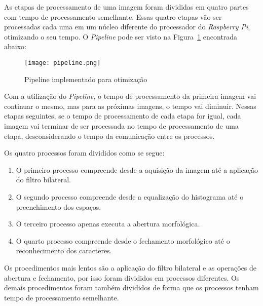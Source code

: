 As etapas de processamento de uma imagem foram divididas em quatro partes com
tempo de processamento semelhante. Essas quatro etapas vão ser processadas cada
uma em um núcleo diferente do processador do \emph{Raspberry Pi}, otimizando o
seu tempo. O \emph{Pipeline} pode ser visto na Figura~\ref{fig:pipeline}
encontrada abaixo:

\begin{figure}[H]
	\centering
	\texttt{[image: pipeline.png]}
	\caption{Pipeline implementado para otimização}
	\label{fig:pipeline}
\end{figure}

Com a utilização do \emph{Pipeline}, o tempo de processamento da primeira imagem vai continuar o mesmo, mas para as próximas imagens, o tempo vai diminuir. Nessas etapas seguintes, se o tempo de processamento de cada etapa for igual, cada imagem vai terminar de ser processada no tempo de processamento de uma etapa, desconsiderando o tempo da comunicação entre os processos.

Os quatro processos foram divididos como se segue:

\begin{enumerate}
	\item O primeiro processo compreende desde a aquisição da imagem até a aplicação do filtro bilateral.
	\item O segundo processo compreende desde a equalização do histograma até o preenchimento dos espaços.
	\item O terceiro processo apenas executa a abertura morfológica.
	\item O quarto processo compreende desde o fechamento morfológico até o reconhecimento dos caracteres.
\end{enumerate}

Os procedimentos mais lentos são a aplicação do filtro bilateral e as operações
de abertura e fechamento, por isso foram divididos em processos diferentes. Os
demais procedimentos foram também divididos de forma que os processos tenham
tempo de processamento semelhante.


